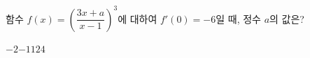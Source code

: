 함수 $f(x)=\left(\dfrac{3x+a}{x-1}\right)^3$에 대하여 $f'(0)=-6$일 때, 정수 $a$의 값은?
\begin{choices32}{$-2$}{$-1$}{$1$}{$2$}{$4$}\end{choices32}
